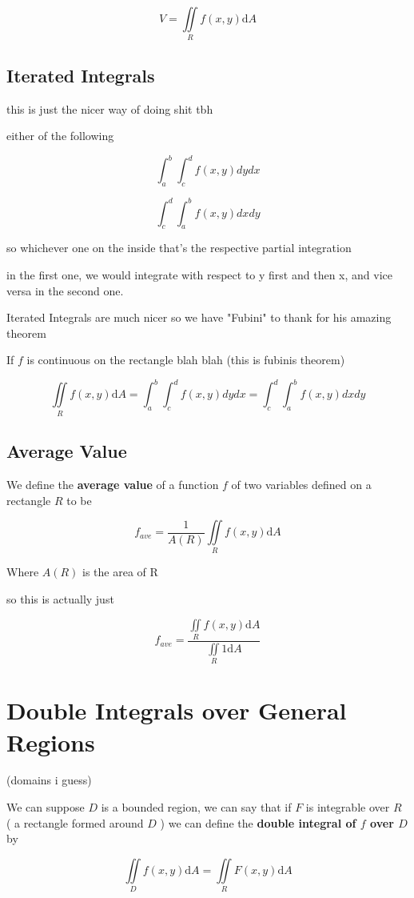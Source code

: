 \documentclass{article}
\begin{document}
$$V = \iint\limits_{R}f(x,y)\mathrm{d}A$$

\subsection{Iterated Integrals}

this is just the nicer way of doing shit tbh

either of the following

$$\int^b_a\int^d_cf(x,y)dy dx$$

$$\int^d_c\int^b_af(x,y)dxdy$$

so whichever one on the inside that's the respective partial integration

in the first one, we would integrate with respect to y first and then x, and vice versa in the second one.

Iterated Integrals are much nicer so we have "Fubini" to thank for his amazing theorem 

If $f$ is continuous on the rectangle blah blah (this is fubinis theorem)

$$\iint\limits_{R}f(x,y)\mathrm{d}A = \int^b_a\int^d_cf(x,y)dy dx  = \int^d_c\int^b_af(x,y)dxdy$$


\subsection{Average Value}

 We define the \textbf{average value} of a function $f$ of two variables defined on a rectangle $R$ to be

$$f_{ave} = \frac{1}{A(R)}\iint\limits_{R}f(x,y)\mathrm{d}A$$

Where $A(R)$ is the area of R

so this is actually just 

$$f_{ave} = \frac{\iint\limits_{R}f(x,y)\mathrm{d}A}{\iint\limits_{R}1\mathrm{d}A}$$


\newpage
\section{Double Integrals over General Regions}

(domains i guess)

We can suppose $D$ is a bounded region, we can say that if $F$ is integrable over $R$ ( a rectangle formed around $D$ ) we can define the \textbf{double integral of $f$ over $D$} by 

$$\iint\limits_{D}f(x,y)\mathrm{d}A = \iint\limits_{R}F(x,y)\mathrm{d}A$$
\end{document}
